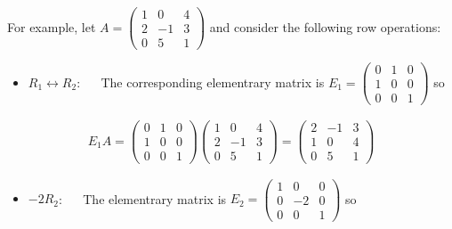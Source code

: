 \documentclass[letterpaper,10pt,english]{jupyterBook}
\begin{document}
\sphinxAtStartPar
For example, let \(A = \begin{pmatrix} 1 & 0 & 4 \\ 2 & -1 & 3 \\ 0 & 5 & 1 \end{pmatrix}\) and consider the following row operations:
\begin{itemize}
\item {} 
\sphinxAtStartPar
\(R_1 \leftrightarrow R_2\):   The corresponding elementrary matrix is  \(E_1 = \begin{pmatrix} 0 & 1 & 0 \\ 1 & 0 & 0 \\ 0 & 0 & 1 \end{pmatrix}\) so

\end{itemize}
\begin{equation*}
\begin{split}E_1A = \begin{pmatrix} 0 & 1 & 0 \\ 1 & 0 & 0 \\ 0 & 0 & 1 \end{pmatrix} \begin{pmatrix} 1 & 0 & 4 \\ 2 & -1 & 3 \\ 0 & 5 & 1 \end{pmatrix} =  \begin{pmatrix} 2 & -1 & 3 \\ 1 & 0 & 4 \\ 0 & 5 & 1 \end{pmatrix}\end{split}
\end{equation*}\begin{itemize}
\item {} 
\sphinxAtStartPar
\(-2R_2\):   The elementrary matrix is \(E_2 = \begin{pmatrix} 1 & 0 & 0 \\ 0 & -2 & 0 \\ 0 & 0 & 1 \end{pmatrix}\) so

\end{itemize}
\end{document}
